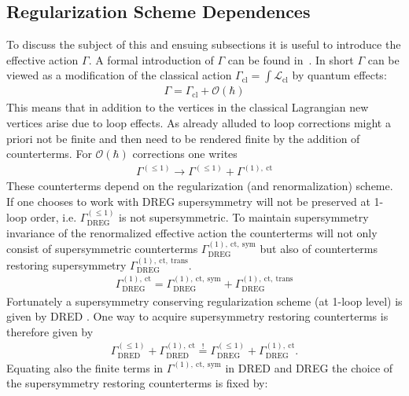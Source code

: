 \subsection{Regularization Scheme Dependences}\label{sec:RegSchemeDep}
To discuss the subject of this and ensuing subsections it is useful to introduce the effective action $\Gamma$. A formal introduction of $\Gamma$ can be found in~\cite{Peskin}. In short $\Gamma$ can be viewed as a modification of the classical action $\Gamma_{\mathrm{cl}} = \int \mathcal{L}_{\mathrm{cl}}$ by quantum effects:
\begin{align}
\Gamma = \Gamma_{\mathrm{cl}} + \mathcal{O}(\hbar)
\end{align}
This means that in addition to the vertices in the classical Lagrangian new vertices arise due to loop effects. As already alluded to loop corrections might a priori not be finite and then need to be rendered finite by the addition of counterterms. For $\mathcal{O}(\hbar)$ corrections one writes
\begin{align}
\Gamma^{(\leq 1)} \to \Gamma^{(\leq 1)} + \Gamma^{(1),\ \mathrm{ct}}
\end{align} 
These counterterms depend on the regularization (and renormalization) scheme. If one chooses to work with DREG supersymmetry will not be preserved at 1-loop order, i.e. $\Gamma^{(\leq 1)}_{\mathrm{DREG}}$ is not supersymmetric. To maintain supersymmetry invariance of the renormalized effective action the counterterms will not only consist of supersymmetric counterterms $\Gamma^{(1),\ \mathrm{ct,\ sym}}_{\mathrm{DREG}}$ but also of counterterms restoring supersymmetry $\Gamma^{(1),\ \mathrm{ct,\ trans}}_{\mathrm{DREG}}$. 
\begin{align}
\Gamma^{(1),\ \mathrm{ct}}_{\mathrm{DREG}} = \Gamma^{(1),\ \mathrm{ct,\ sym}}_{\mathrm{DREG}} + \Gamma^{(1),\ \mathrm{ct,\ trans}}_{\mathrm{DREG}}
\end{align}
Fortunately a supersymmetry conserving regularization scheme (at 1-loop level) is given by DRED \cite{Hollik:2001cz}. One way to acquire supersymmetry restoring counterterms is therefore given by
\begin{align}
\Gamma^{(\leq 1)}_{\mathrm{DRED}} + \Gamma^{(1),\ \mathrm{ct}}_{\mathrm{DRED}} \overset{!}{=} \Gamma^{(\leq 1)}_{\mathrm{DREG}} + \Gamma^{(1),\ \mathrm{ct}}_{\mathrm{DREG}}.
\end{align}
Equating also the finite terms in $\Gamma^{(1),\ \mathrm{ct,\ sym}}$ in DRED and DREG the choice of the supersymmetry restoring counterterms is fixed by\cite{Varso}:
